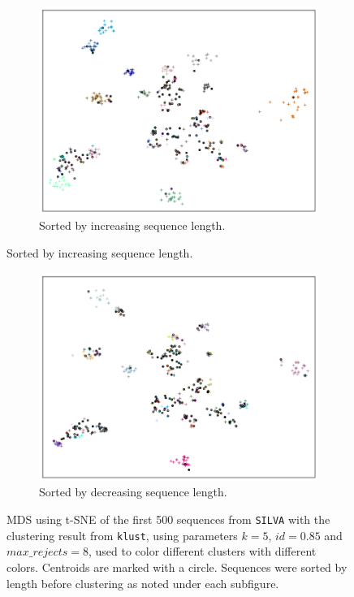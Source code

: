 \begin{figure}[H]
  \hfill\\
  \hspace{2em}
  \begin{subfigure}[b]{1.0\textwidth}
    \includegraphics[width=1.0\textwidth]{graphics/SILVA_t-SNE_incr_sort_500.png}
    \caption{Sorted by increasing sequence length.}
    \label{fig:mds_silva_sort_incr}
  \end{subfigure}
\end{figure}
\clearpage
\begin{figure}[H]
  \ContinuedFloat
  \begin{subfigure}[b]{1.0\textwidth}
    \includegraphics[width=1.0\textwidth]{graphics/SILVA_t-SNE_decr_sort_500.png}
    \caption{Sorted by decreasing sequence length.}
    \label{fig:mds_silva_sort_decr}
  \end{subfigure}
  \caption{MDS using t-SNE of the first 500 sequences from \texttt{SILVA} with
    the clustering result from \texttt{klust}, using parameters $k=5$,
    $id=0.85$ and $max\_rejects=8$, used to color different clusters with
    different colors. Centroids are marked with a circle. Sequences were sorted
    by length before clustering as noted under each subfigure.}
  \label{fig:mds_silva}
\end{figure}

